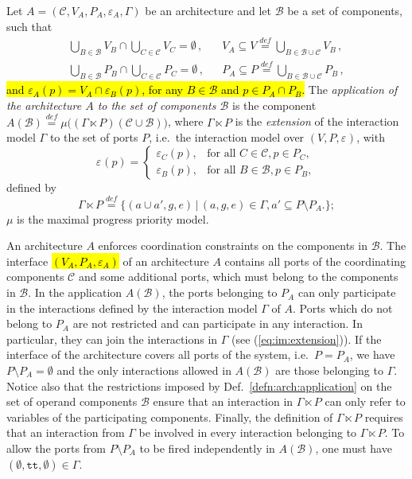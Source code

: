 \documentclass{llncs}
\newcommand{\todoSBin}[2][inline,color=green!40]{\todo[#1]{\textbf{To-do Simon: } {#2}}}
\newcommand{\defn}[1]{Def.~\ref{defn:#1}}
\newcommand{\eq}[1]{(\ref{eq:#1})}
\newcommand{\cB}{\ensuremath{\mathcal{B}}}
\newcommand{\cC}{\ensuremath{\mathcal{C}}}
\newcommand{\ie}[1][\ ]{i.e.#1}
\newcommand{\bydef}[1]{\ensuremath{\stackrel{\mathit{\scriptscriptstyle def}}{#1}}}
\newcommand{\setdefb}[2]{\ensuremath{\bigl\{{#1}\,\bigl|\,{#2}\bigr.\bigr\}}}
\newcommand{\true} {\ensuremath{\mathtt{t\!t}}}
\newcommand{\noop} {\ensuremath{\emptyset}} %
\newcommand{\export}[1][]{\ensuremath{\varepsilon_{#1}}}
\newcommand{\IMextend}[2]{\ensuremath{#1 \ltimes #2}}
\newcommand{\arequiv}{\equiv}
\begin{document}
\begin{definition}
  \label{defn:arch:application}
  Let $A = (\cC, V_A, P_A, \export[A], \Gamma)$ be an architecture and let $\cB$
  be a set of components, such that
%
  \begin{align}
    \bigcup_{B \in \cB} V_B \cap \bigcup_{C \in \cC} V_C = \emptyset\,,
    &&
    V_A \subseteq V \bydef{=} \bigcup_{B \in \cB \cup \cC} V_B\,,
    \\
    \bigcup_{B \in \cB} P_B \cap \bigcup_{C \in \cC} P_C = \emptyset\,,
    &&
    P_A \subseteq P \bydef{=} \bigcup_{B \in \cB \cup \cC} P_B\,,
  \end{align}
%
  \hl{and $\export[A](p) = V_A \cap \export[B](p)$, for any $B \in \cB$
  and $p \in P_A \cap P_B$.}
%
  The \emph{application of the architecture $A$ to the set of
  components $\cB$} is the component $ A(\cB) \bydef{=}
  \mu\bigl((\IMextend{\Gamma}{P})(\cC \cup \cB)\bigr)$, where
%
  $\IMextend{\Gamma}{P}$ is the \emph{extension} of the interaction
  model $\Gamma$ to the set of ports $P$, \ie the interaction model
  over $(V, P, \export)$, with
  \[
  \export(p) = 
  \begin{cases}
    \export[C](p), & \text{for all } C \in \cC, p \in P_C,
    \\
    \export[B](p), & \text{for all } B \in \cB, p \in P_B,
  \end{cases}
  \]
  defined by
%
  \begin{equation}
    \label{eq:im:extension}
    \IMextend{\Gamma}{P} \bydef{=}
    \setdefb{
      (a \cup a', g, e)
    }{
      (a, g, e) \in \Gamma, a' \subseteq P \setminus P_A
    }
    ;
  \end{equation}
%
  $\mu$ is the maximal progress priority model.
\end{definition}

\todoSBin{Define equivalence $\arequiv$?}

An architecture $A$ enforces coordination constraints on the
components in $\cB$.  The interface \hl{$(V_A, P_A, \export[A])$} of an
architecture $A$ contains all ports of the coordinating
components $\cC$ and some additional ports, which must belong to
the components in $\cB$.  In the application $A(\cB)$, the ports
belonging to $P_A$ can only participate in the interactions
defined by the interaction model $\Gamma$ of $A$.  Ports which do
not belong to $P_A$ are not restricted and can participate in any
interaction.  In particular, they can join the interactions in
$\Gamma$ (see \eq{im:extension}).  If the interface of the
architecture covers all ports of the system, \ie $P = P_A$, we
have $P\setminus P_A = \emptyset$ and the only interactions
allowed in $A(\cB)$ are those belonging to $\Gamma$.  Notice also
that the restrictions imposed by \defn{arch:application} on the
set of operand components $\cB$ ensure that an interaction in
$\IMextend{\Gamma}{P}$ can only refer to variables of the
participating components.
%
Finally, the definition of $\IMextend{\Gamma}{P}$ requires that
an interaction from $\Gamma$ be involved in every interaction
belonging to $\IMextend{\Gamma}{P}$.  To allow the ports from $P
\setminus P_A$ to be fired independently in $A(\cB)$, one must
have $(\emptyset, \true, \noop) \in \Gamma$.  
\end{document}
